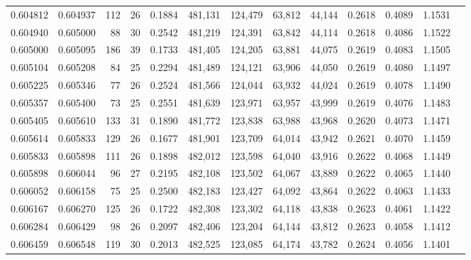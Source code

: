 \begin{tabular}{rrrrrrrrrrrrr}
0.604812 & 0.604937 &    112 &    26 &                                     0.1884 & 481,131 & 124,479 &  63,812 &  44,144 & 0.2618 & 0.4089 & 1.1531 \\
0.604940 & 0.605000 &     88 &    30 &                                     0.2542 & 481,219 & 124,391 &  63,842 &  44,114 & 0.2618 & 0.4086 & 1.1522 \\
0.605000 & 0.605095 &    186 &    39 &                                     0.1733 & 481,405 & 124,205 &  63,881 &  44,075 & 0.2619 & 0.4083 & 1.1505 \\
0.605104 & 0.605208 &     84 &    25 &                                     0.2294 & 481,489 & 124,121 &  63,906 &  44,050 & 0.2619 & 0.4080 & 1.1497 \\
0.605225 & 0.605346 &     77 &    26 &                                     0.2524 & 481,566 & 124,044 &  63,932 &  44,024 & 0.2619 & 0.4078 & 1.1490 \\
0.605357 & 0.605400 &     73 &    25 &                                     0.2551 & 481,639 & 123,971 &  63,957 &  43,999 & 0.2619 & 0.4076 & 1.1483 \\
0.605405 & 0.605610 &    133 &    31 &                                     0.1890 & 481,772 & 123,838 &  63,988 &  43,968 & 0.2620 & 0.4073 & 1.1471 \\
0.605614 & 0.605833 &    129 &    26 &                                     0.1677 & 481,901 & 123,709 &  64,014 &  43,942 & 0.2621 & 0.4070 & 1.1459 \\
0.605833 & 0.605898 &    111 &    26 &                                     0.1898 & 482,012 & 123,598 &  64,040 &  43,916 & 0.2622 & 0.4068 & 1.1449 \\
0.605898 & 0.606044 &     96 &    27 &                                     0.2195 & 482,108 & 123,502 &  64,067 &  43,889 & 0.2622 & 0.4065 & 1.1440 \\
0.606052 & 0.606158 &     75 &    25 &                                     0.2500 & 482,183 & 123,427 &  64,092 &  43,864 & 0.2622 & 0.4063 & 1.1433 \\
0.606167 & 0.606270 &    125 &    26 &                                     0.1722 & 482,308 & 123,302 &  64,118 &  43,838 & 0.2623 & 0.4061 & 1.1422 \\
0.606284 & 0.606429 &     98 &    26 &                                     0.2097 & 482,406 & 123,204 &  64,144 &  43,812 & 0.2623 & 0.4058 & 1.1412 \\
0.606459 & 0.606548 &    119 &    30 &                                     0.2013 & 482,525 & 123,085 &  64,174 &  43,782 & 0.2624 & 0.4056 & 1.1401 \\

\end{tabular}
